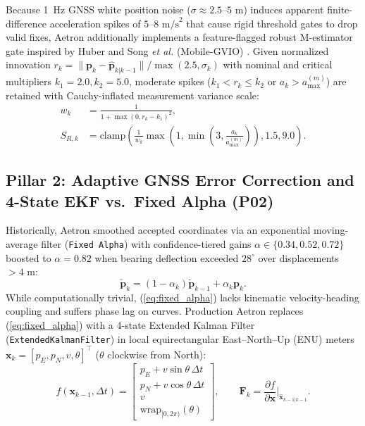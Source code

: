 \documentclass[journal]{IEEEtran}
\begin{document}
Because 1~Hz GNSS white position noise ($\sigma \approx 2.5\text{--}5\text{ m}$) induces apparent finite-difference acceleration spikes of $5\text{--}8\text{ m/s}^2$ that cause rigid threshold gates to drop valid fixes, Aetron additionally implements a feature-flagged robust M-estimator gate inspired by Huber \cite{huber1981robust} and Song \emph{et al.} (Mobile-GVIO) \cite{song2025mobilegvio}. Given normalized innovation $r_k = \|\mathbf{p}_k - \hat{\mathbf{p}}_{k|k-1}\| / \max(2.5, \sigma_k)$ with nominal and critical multipliers $k_1 = 2.0, k_2 = 5.0$, moderate spikes ($k_1 < r_k \le k_2$ or $a_k > a_{\max}^{(m)}$) are retained with Cauchy-inflated measurement variance scale:
\begin{equation}
  \begin{aligned}
    w_k &= \frac{1}{1 + \max(0, r_k - k_1)^2}, \\
    S_{R,k} &= \mathrm{clamp}\!\left(\frac{1}{w_k}\max\!\left(1, \min\!\left(3, \frac{a_k}{a_{\max}^{(m)}}\right)\right), 1.5, 9.0\right).
  \end{aligned}
  \label{eq:gvio_cauchy}
\end{equation}

\subsection{Pillar 2: Adaptive GNSS Error Correction and 4-State EKF vs.\ Fixed Alpha (P02)}
Historically, Aetron smoothed accepted coordinates via an exponential moving-average filter (\texttt{Fixed Alpha}) with confidence-tiered gains $\alpha \in \{0.34, 0.52, 0.72\}$ boosted to $\alpha = 0.82$ when bearing deflection exceeded $28^\circ$ over displacements $>4\text{ m}$:
\begin{equation}
  \tilde{\mathbf{p}}_k = (1 - \alpha_k)\tilde{\mathbf{p}}_{k-1} + \alpha_k \mathbf{p}_k.
  \label{eq:fixed_alpha}
\end{equation}
While computationally trivial, (\ref{eq:fixed_alpha}) lacks kinematic velocity-heading coupling and suffers phase lag on curves. Production Aetron replaces (\ref{eq:fixed_alpha}) with a 4-state Extended Kalman Filter (\texttt{ExtendedKalmanFilter}) in local equirectangular East--North--Up (ENU) meters $\mathbf{x}_k = [p_E, p_N, v, \theta]^\top$ ($\theta$ clockwise from North):
\begin{equation}
  f(\mathbf{x}_{k-1}, \Delta t) =
  \begin{bmatrix}
    p_E + v \sin\theta \, \Delta t \\
    p_N + v \cos\theta \, \Delta t \\
    v \\
    \mathrm{wrap}_{[0,2\pi)}(\theta)
  \end{bmatrix}, \qquad
  \mathbf{F}_k = \frac{\partial f}{\partial \mathbf{x}}\bigg|_{\hat{\mathbf{x}}_{k-1|k-1}}.
  \label{eq:ekf_predict}
\end{equation}
\end{document}
